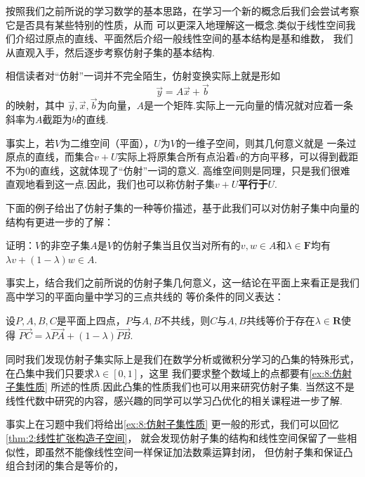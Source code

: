 按照我们之前所说的学习数学的基本思路，在学习一个新的概念后我们会尝试考察它是否具有某些特别的性质，从而
可以更深入地理解这一概念.类似于线性空间我们介绍过原点的直线、平面然后介绍一般线性空间的基本结构是基和维数，
我们从直观入手，然后逐步考察仿射子集的基本结构.

相信读者对``仿射''一词并不完全陌生，仿射变换实际上就是形如\[\vec{y}=A\vec{x}+\vec{b}\]的映射，其中
$\vec{y},\vec{x},\vec{b}$为向量，$A$是一个矩阵.实际上一元向量的情况就对应着一条斜率为$A$截距为$b$的直线.

事实上，若$V$为二维空间（平面），$U$为$V$的一维子空间，则其几何意义就是
一条过原点的直线，而集合$v+U$实际上将原集合所有点沿着$v$的方向平移，可以得到截距不为0的直线，这就体现了``仿射''一词的意义.
高维空间则是同理，只是我们很难直观地看到这一点.因此，我们也可以称仿射子集$v+U$\textbf{\heiti 平行于}$U$.

下面的例子给出了仿射子集的一种等价描述，基于此我们可以对仿射子集中向量的结构有更进一步的了解：
\begin{example}\label{ex:8:仿射子集性质}
    证明：$V$的非空子集$A$是$V$的仿射子集当且仅当对所有的$v,w\in A$和$\lambda\in\mathbf{F}$均有
    $\lambda v+(1-\lambda)w\in A$.
\end{example}
\begin{solution}

\end{solution}

事实上，结合我们之前所说的仿射子集几何意义，这一结论在平面上来看正是我们高中学习的平面向量中学习的三点共线的
等价条件的同义表达：
\begin{theorem}
    设$P,A,B,C$是平面上四点，$P$与$A,B$不共线，则$C$与$A,B$共线等价于存在$\lambda\in\mathbf{R}$使得
    $\overrightarrow{PC}=\lambda\overrightarrow{PA}+(1-\lambda)\overrightarrow{PB}$.
\end{theorem}
同时我们发现仿射子集实际上是我们在数学分析或微积分学习的凸集的特殊形式，在凸集中我们只要求$\lambda\in[0,1]$，这里
我们要求整个数域上的点都要有\autoref{ex:8:仿射子集性质} 所述的性质.因此凸集的性质我们也可以用来研究仿射子集.
当然这不是线性代数中研究的内容，感兴趣的同学可以学习凸优化的相关课程进一步了解.

事实上在习题中我们将给出\autoref*{ex:8:仿射子集性质} 更一般的形式，我们可以回忆\autoref{thm:2:线性扩张构造子空间}，
就会发现仿射子集的结构和线性空间保留了一些相似性，即虽然不能像线性空间一样保证加法数乘运算封闭，
但仿射子集和保证凸组合封闭的集合是等价的，

